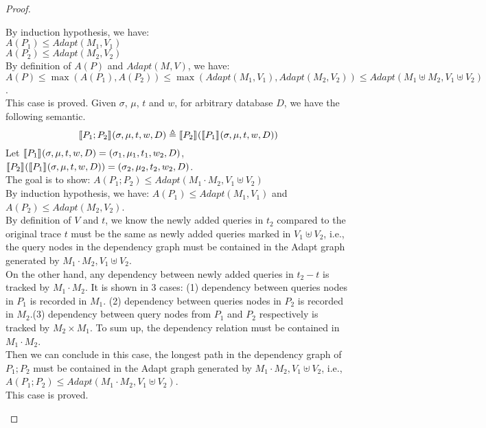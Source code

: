 \documentclass[a4paper,11pt]{article}
\begin{document}
\begin{proof}
\begin{itemize}
\[\]
By induction hypothesis, we have:
\\
$A(P_1) \leq Adapt(M_1, V_1)$
\\
$A(P_2) \leq Adapt(M_2, V_2)$
\\
By definition of $A(P)$ and $Adapt(M, V)$, we have:
\\
$A(P) \leq \max(A(P_1), A(P_2))
\leq \max(Adapt(M_1, V_1), Adapt(M_2, V_2)) 
\leq Adapt(M_1 \uplus M_2, V_1 \uplus V_2)$.
\\
This case is proved.
%
%
%
%
Given $\sigma$, $\mu$, $t$ and $w$, for arbitrary database $D$, we have the following semantic.
%
\[
\llbracket P_1 ; P_2 \rrbracket_{} (\sigma, \mu , t, w , D) 
\triangleq 
\llbracket P_2\rrbracket_{} ( \llbracket P_1\rrbracket_{} (\sigma , \mu, t, w, D))
\]
%
Let $\llbracket P_1\rrbracket_{} (\sigma , \mu, t, w, D) = (\sigma_1 , \mu_1, t_1, w_2, D)$, 
$\llbracket P_2\rrbracket_{} ( \llbracket P_1\rrbracket_{} (\sigma , \mu, t, w, D)) = (\sigma_2 , \mu_2, t_2, w_2, D)$.
%
\\
The goal is to show: $A(P_1; P_2) \leq Adapt(M_1 \cdot M_2, V_1 \uplus V_2)$
%
\\
By induction hypothesis, we have:
$A(P_1) \leq Adapt(M_1, V_1)$ and 
$A(P_2) \leq Adapt(M_2, V_2)$.
\\
By definition of $V$ and $t$, we know the newly added queries in $t_2$ compared to the original trace $t$ must be the same as newly added queries marked in
$V_1 \uplus V_2$, 
i.e., the query nodes in the dependency graph must be contained in the Adapt graph generated by $M_1 \cdot M_2, V_1 \uplus V_2 $.
%
\\
On the other hand, any dependency between newly added queries in $t_2 - t$ is tracked by $M_1 \cdot M_2$. It is shown in $3$ cases: (1) dependency between queries nodes in $P_1$ is recorded in $M_1$. (2) dependency between queries nodes in $P_2$ is recorded in $M_2$.(3) dependency between query nodes from $P_1$ and $P_2$ respectively is tracked by $M_2 \times M_1$. To sum up,   
the dependency relation must be contained in $M_1 \cdot M_2$.
\\
Then we can conclude in this case, the longest path in the dependency graph of $P_1; P_2$ must be contained in the
Adapt graph generated by $M_1 \cdot M_2, V_1 \uplus V_2 $, i.e., $A(P_1; P_2) \leq Adapt(M_1 \cdot M_2, V_1 \uplus V_2)$.
\\
This case is proved.

\end{itemize}
\end{proof}
\end{document}
